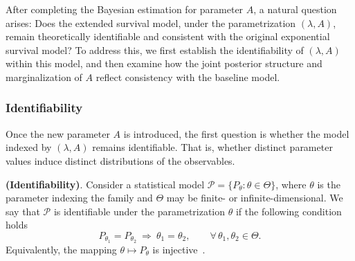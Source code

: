 After completing the Bayesian estimation for parameter $A$, a natural question arises: 
Does the extended survival model, under the parametrization $(\lambda, A)$, remain theoretically identifiable and consistent with the original exponential survival model?
To address this, we first establish the identifiability of $(\lambda, A)$ within this model, and then examine how the joint posterior structure and marginalization of $A$ reflect consistency with the baseline model. 

\subsubsection{Identifiability}
Once the new parameter $A$ is introduced, the first question is whether the model indexed by $(\lambda, A)$ remains identifiable. That is, whether distinct parameter values induce distinct distributions of the observables.
\begin{definition}\textbf{(Identifiability)}. Consider a statistical model $\mathcal P=\{P_\theta:\theta\in\Theta\}$, where $\theta$ is the parameter indexing the family and $\Theta$ may be finite- or infinite-dimensional. We say that $\mathcal P$ is identifiable under the parametrization $\theta$ if the following condition holds~\cite{lehmann1998theory, van2000asymptotic}
\begin{equation}
    P_{\theta_1}=P_{\theta_2}\ \Longrightarrow\ \theta_1=\theta_2,\qquad \forall\,\theta_1,\theta_2\in\Theta .
\end{equation}
Equivalently, the mapping $\theta\mapsto P_\theta$ is injective~\cite{lehmann1998theory}.
\end{definition}
